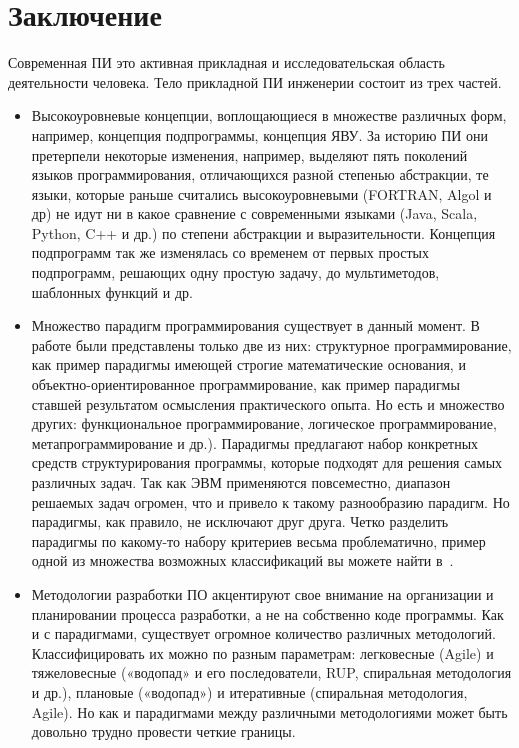\section{Заключение}

Современная ПИ это активная прикладная и исследовательская область деятельности человека. Тело прикладной ПИ инженерии состоит из трех частей.
\begin{itemize}
  \item Высокоуровневые концепции, воплощающиеся в множестве различных форм, например, концепция подпрограммы, концепция ЯВУ. За историю ПИ они претерпели некоторые изменения, например, выделяют пять поколений языков программирования, отличающихся разной степенью абстракции, те языки, которые раньше считались высокоуровневыми (FORTRAN, Algol и др) не идут ни в какое сравнение с современными языками (Java, Scala, Python, C++ и др.) по степени абстракции и выразительности. Концепция подпрограмм так же изменялась со временем от первых простых подпрограмм, решающих одну простую задачу, до мультиметодов, шаблонных функций и др.
  \item Множество парадигм программирования существует в данный момент. В работе были представлены только две из них: структурное программирование, как пример парадигмы имеющей строгие математические основания, и объектно-ориентированное программирование, как пример парадигмы ставшей результатом осмысления практического опыта. Но есть и множество других: функциональное программирование, логическое программирование, метапрограммирование и др.). Парадигмы предлагают набор конкретных средств структурирования программы, которые подходят для решения самых различных задач. Так как ЭВМ применяются повсеместно, диапазон решаемых задач огромен, что и привело к такому разнообразию парадигм. Но парадигмы, как правило, не исключают друг друга. Четко разделить парадигмы по какому-то набору критериев весьма проблематично, пример одной из множества возможных классификаций вы можете найти в~\cite{TPPP}.
  \item Методологии разработки ПО акцентируют свое внимание на организации и планировании процесса разработки, а не на собственно коде программы. Как и с парадигмами, существует огромное количество различных методологий. Классифицировать их можно по разным параметрам: легковесные (Agile) и тяжеловесные («водопад» и его последователи, RUP, спиральная методология и др.), плановые («водопад») и итеративные (спиральная методология, Agile). Но как и парадигмами между различными методологиями может быть довольно трудно провести четкие границы.
\end{itemize}

